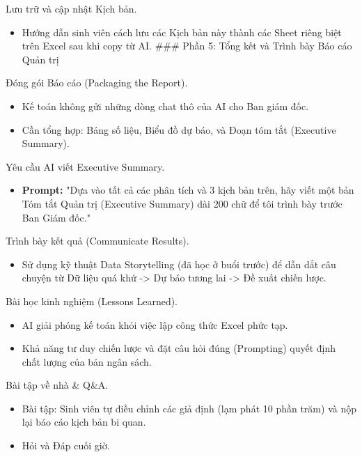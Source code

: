 \documentclass[aspectratio=169]{beamer}
\begin{document}
\begin{frame}{Lưu trữ và cập nhật Kịch bản.}
    \begin{itemize}
        \item Hướng dẫn sinh viên cách lưu các Kịch bản này thành các Sheet riêng biệt trên Excel sau khi copy từ AI.
        ### Phần 5: Tổng kết và Trình bày Báo cáo Quản trị
    \end{itemize}
\end{frame}


\begin{frame}{Đóng gói Báo cáo (Packaging the Report).}
    \begin{itemize}
        \item Kế toán không gửi những dòng chat thô của AI cho Ban giám đốc.
        \item Cần tổng hợp: Bảng số liệu, Biểu đồ dự báo, và Đoạn tóm tắt (Executive Summary).
    \end{itemize}
\end{frame}


\begin{frame}{Yêu cầu AI viết Executive Summary.}
    \begin{itemize}
        \item \textbf{Prompt:} "Dựa vào tất cả các phân tích và 3 kịch bản trên, hãy viết một bản Tóm tắt Quản trị (Executive Summary) dài 200 chữ để tôi trình bày trước Ban Giám đốc."
    \end{itemize}
\end{frame}


\begin{frame}{Trình bày kết quả (Communicate Results).}
    \begin{itemize}
        \item Sử dụng kỹ thuật Data Storytelling (đã học ở buổi trước) để dẫn dắt câu chuyện từ Dữ liệu quá khứ -> Dự báo tương lai -> Đề xuất chiến lược.
    \end{itemize}
\end{frame}


\begin{frame}{Bài học kinh nghiệm (Lessons Learned).}
    \begin{itemize}
        \item AI giải phóng kế toán khỏi việc lập công thức Excel phức tạp.
        \item Khả năng tư duy chiến lược và đặt câu hỏi đúng (Prompting) quyết định chất lượng của bản ngân sách.
    \end{itemize}
\end{frame}


\begin{frame}{Bài tập về nhà \& Q\&A.}
    \begin{itemize}
        \item Bài tập: Sinh viên tự điều chỉnh các giả định (lạm phát 10 phần trăm) và nộp lại báo cáo kịch bản bi quan.
        \item Hỏi và Đáp cuối giờ.
    \end{itemize}
\end{frame}
\end{document}
